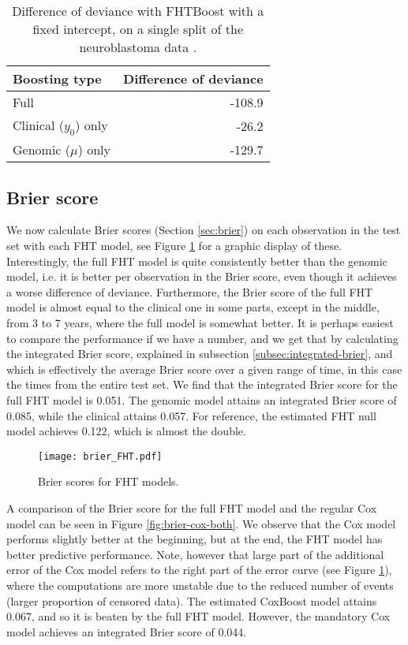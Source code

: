 \begin{table}
\caption{Difference of deviance with FHTBoost with a fixed intercept, on a single split of the neuroblastoma data \citep{oberthuer-data}.}
\label{tab:deviances}
\centering
\begin{tabular}{lr}
\toprule
Boosting type & Difference of deviance \\
\hline
Full                   & -108.9 \\
Clinical ($y_0$) only  &  -26.2 \\
Genomic ($\mu$) only   & -129.7 \\
\bottomrule
\end{tabular}
\end{table}

\subsection{Brier score}
We now calculate Brier scores (Section \ref{sec:brier}) on each observation in the test set with each FHT model, see Figure \ref{fig:brier-FHT} for a graphic display of these.
Interestingly, the full FHT model is quite consistently better than the genomic model, i.e. it is better per observation in the Brier score, even though it achieves a worse difference of deviance.
Furthermore, the Brier score of the full FHT model is almost equal to the clinical one in some parts, except in the middle, from 3 to 7 years, where the full model is somewhat better.
It is perhaps easiest to compare the performance if we have a number, and we get that by calculating the integrated Brier score, explained in subsection \ref{subsec:integrated-brier}, and which is effectively the average Brier score over a given range of time, in this case the times from the entire test set.
We find that the integrated Brier score for the full FHT model is 0.051.
The genomic model attains an integrated Brier score of 0.085, while the clinical attains 0.057.
For reference, the estimated FHT null model achieves 0.122, which is almost the double.

\begin{figure}
\caption{Brier scores for FHT models.}
\label{fig:brier-FHT}
\centering\texttt{[image: brier\_FHT.pdf]}
\end{figure}

A comparison of the Brier score for the full FHT model and the regular Cox model can be seen in Figure \ref{fig:brier-cox-both}.
We observe that the Cox model performs slightly better at the beginning, but at the end, the FHT model has better predictive performance.
Note, however that large part of the additional error of the Cox model refers to the right part of the error curve (see Figure \ref{fig:brier-FHT}), where the computations are more unstable due to the reduced number of events (larger proportion of censored data).
The estimated CoxBoost model attains 0.067, and so it is beaten by the full FHT model.
However, the mandatory Cox model achieves an integrated Brier score of 0.044.

